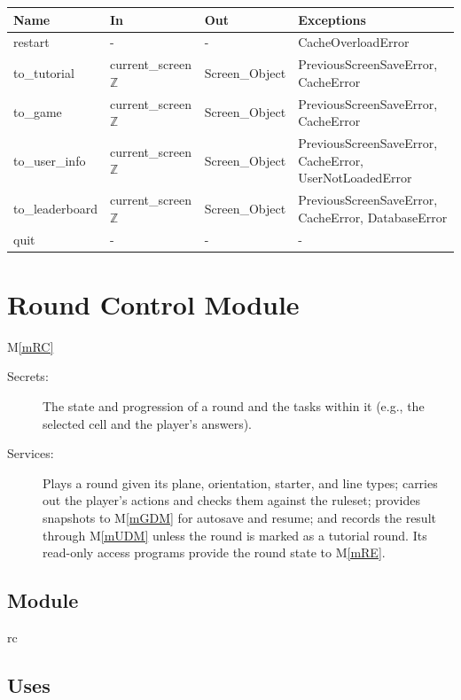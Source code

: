 \documentclass[12pt, titlepage]{article}
\newcommand{\mref}[1]{M\ref{#1}}
\begin{document}
\begin{center}
\begin{tabular}{p{4cm} p{4cm} p{4cm} p{4cm}}
\hline
\textbf{Name} & \textbf{In} & \textbf{Out} & \textbf{Exceptions} \\
\hline
restart & - & - & CacheOverloadError \\
to\_tutorial & current\_screen\: $\mathbb{Z}$ & Screen\_Object &  PreviousScreenSaveError, CacheError \\
to\_game & current\_screen\: $\mathbb{Z}$ & Screen\_Object &  PreviousScreenSaveError, CacheError  \\
to\_user\_info & current\_screen\: $\mathbb{Z}$ & Screen\_Object &  PreviousScreenSaveError, CacheError, UserNotLoadedError \\
to\_leaderboard & current\_screen\: $\mathbb{Z}$ & Screen\_Object &  PreviousScreenSaveError, CacheError, DatabaseError \\
quit & - & - & - \\


\hline
\end{tabular}
\end{center}

\newpage

\section{Round Control Module} \mref{mRC} 

\begin{description}
\item[Secrets:] The state and progression of a round and the tasks within it (e.g., the selected cell and the player's answers).
\item[Services:] Plays a round given its plane, orientation, starter, and line types; carries out the player's actions and checks them against the ruleset; provides snapshots to \mref{mGDM} for autosave and resume; and records the result through \mref{mUDM} unless the round is marked as a tutorial round. Its read-only access programs provide the round state to \mref{mRE}.
\end{description}

\subsection{Module}

rc

\subsection{Uses}
\end{document}
